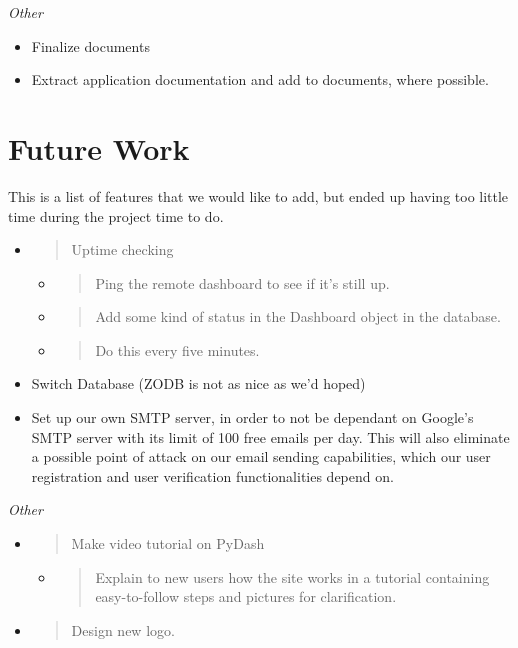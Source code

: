 \emph{Other}
\begin{itemize}
\item Finalize documents
\item Extract application documentation and add to documents, where possible.
\end{itemize}




\hypertarget{backlog}{%
\section{Future Work}\label{backlog}}

This is a list of features that we would like to add, but ended up having too little time during the project time to do.

\begin{itemize}
\item
  \begin{quote}
  Uptime checking
  \end{quote}

  \begin{itemize}
  \item
    \begin{quote}
    Ping the remote dashboard to see if it's still up.
    \end{quote}
  \item
    \begin{quote}
    Add some kind of status in the Dashboard object in the database.
    \end{quote}
  \item
    \begin{quote}
    Do this every five minutes.
    \end{quote}
  \end{itemize}
\item Switch Database (ZODB is not as nice as we'd hoped)  
\item Set up our own SMTP server, in order to not be dependant on Google's SMTP server with its limit of 100 free emails per day. This will also eliminate a possible point of attack on our email sending capabilities, which our user registration and user verification functionalities depend on.
\end{itemize}

\emph{Other}

\begin{itemize}
\item
  \begin{quote}
  Make video tutorial on PyDash
  \end{quote}

  \begin{itemize}
  \item
    \begin{quote}
    Explain to new users how the site works in a tutorial containing
    easy-to-follow steps and pictures for clarification.
    \end{quote}
  \end{itemize}
\item
  \begin{quote}
  Design new logo.
  \end{quote}
\end{itemize}

